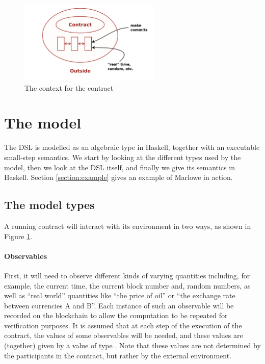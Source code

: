 \documentclass[
      acmsmall
    , screen
    , review=true
  ]{acmart}
\begin{document}
\begin{figure}[t]
\begin{center}
\includegraphics[width=0.6\textwidth]{pix/context.png}
\caption{The context for the contract}
\label{fig:context}
\end{center}
\end{figure}


\section{The model}
\label{section:model}

The DSL is modelled as an algebraic type in Haskell, together with an executable small-step semantics. 
We start by looking at the different types used by the model, then we look at the  DSL itself, and finally we give its semantics in Haskell. Section \ref{section:example} gives an example of Marlowe in action.

\subsection{The model types}

A running contract will interact with its environment in two ways, as shown in Figure \ref{fig:context}.

\paragraph{Observables}


First, it will need to observe different kinds of varying quantities including, for example, the current time, the current block number and, random numbers, as well as ``real world'' quantities like ``the price of oil'' or ``the exchange rate between currencies A and B''. Each instance of such an observable will be recorded on the blockchain to allow the computation to be repeated for verification purposes. It is assumed that at each step of the execution of the contract, the values of some observables will be needed, and these values are (together) given by a value of type . Note that these values are not determined by the participants in the contract, but rather by the external environment.
\end{document}
